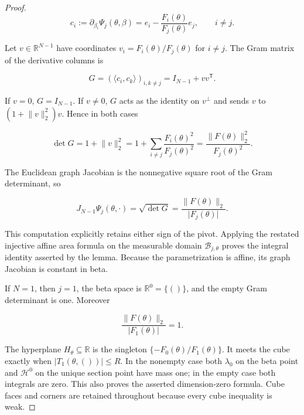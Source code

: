 \begin{proof}
\begin{equation}
\label{eq:appendix-display-114}
c_i
:=\partial_{\beta_i}\Psi_j(\theta,\beta)
=e_i-\frac{F_i(\theta)}{F_j(\theta)}e_j,
\qquad i\neq j.
\end{equation}

Let \(v\in\mathbb R^{N-1}\) have coordinates \(v_i=F_i(\theta)/F_j(\theta)\) for \(i\neq j\). The Gram
matrix of the derivative columns is

\begin{equation}
\label{eq:appendix-display-115}
G=(\langle c_i,c_k\rangle)_{i,k\neq j}
=I_{N-1}+vv^{\mathsf T}.
\end{equation}

If \(v=0\), \(G=I_{N-1}\). If \(v\neq0\), \(G\) acts as the identity on \(v^\perp\) and sends \(v\) to
\((1+\lVert v\rVert_2^2)v\). Hence in both cases

\begin{equation}
\label{eq:appendix-display-116}
\det G
=1+\lVert v\rVert_2^2
=1+\sum_{i\neq j}\frac{F_i(\theta)^2}{F_j(\theta)^2}
=\frac{\lVert F(\theta)\rVert_2^2}{F_j(\theta)^2}.
\end{equation}

The Euclidean graph Jacobian is the nonnegative square root of the Gram determinant, so

\begin{equation}
\label{eq:appendix-display-117}
J_{N-1}\Psi_j(\theta,\cdot)
=\sqrt{\det G}
=\frac{\lVert F(\theta)\rVert_2}{\lvert F_j(\theta)\rvert}.
\end{equation}

This computation explicitly retains either sign of the pivot. Applying the restated injective affine area
formula on the measurable domain \(\mathcal B_{j,\theta}\) proves the integral identity asserted by the lemma. Because
the parametrization is affine, its graph Jacobian is constant in beta.

If \(N=1\), then \(j=1\), the beta space is \(\mathbb R^0=\{()\}\), and the empty Gram determinant is one.
Moreover

\begin{equation}
\label{eq:appendix-display-118}
\frac{\lVert F(\theta)\rVert_2}{\lvert F_1(\theta)\rvert}=1.
\end{equation}

The hyperplane \(H_\theta\subseteq\mathbb R\) is the singleton
\(\{-F_0(\theta)/F_1(\theta)\}\). It meets the cube exactly when
\(\lvert T_1(\theta,())\rvert\leq R\). In the nonempty case both \(\lambda_0\) on the beta point and
\(\mathcal H^0\) on the unique section point have mass one; in the empty case both integrals are zero. This
also proves the asserted dimension-zero formula. Cube faces and corners are retained throughout because every
cube inequality is weak. 
\end{proof}

